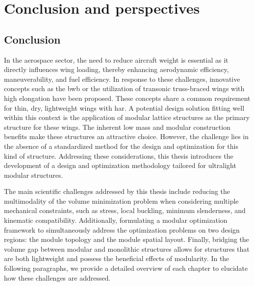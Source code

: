 \setchapterpreamble[u]{\margintoc}
\glsresetall %

\chapter*{Conclusion and perspectives}
{}
%

\section*{Conclusion}
In the aerospace sector, the need to reduce aircraft weight is essential as it directly influences wing loading, thereby enhancing aerodynamic efficiency, maneuverability, and fuel efficiency. In response to these challenges, innovative concepts such as the \gls{bwb} or the utilization of transonic truss-braced wings with high elongation have been proposed. These concepts share a common requirement for thin, dry, lightweight wings with \gls{har}. A potential design solution fitting well within this context is the application of modular lattice structures as the primary structure for these wings. The inherent low mass and modular construction benefits make these structures an attractive choice. However, the challenge lies in the absence of a standardized method for the design and optimization for this kind of structure. Addressing these considerations, this thesis introduces the development of a design and optimization methodology tailored for ultralight modular structures.

The main scientific challenges addressed by this thesis include reducing the multimodality of the volume minimization problem when considering multiple mechanical constraints, such as stress, local buckling, minimum slenderness, and kinematic compatibility. Additionally, formulating a modular optimization framework to simultaneously address the optimization problems on two design regions: the module topology and the module spatial layout. Finally, bridging the volume gap between modular and monolithic structures allows for structures that are both lightweight and possess the beneficial effects of modularity. In the following paragraphs, we provide a detailed overview of each chapter to elucidate how these challenges are addressed.
 
